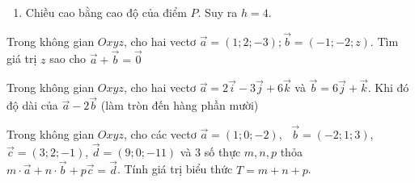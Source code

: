 \begin{ex}
{\begin{enumerate}
			      Suy ra
			      \begin{eqnarray*}
				      \cos \widehat{PFE}&=&\cos \left(\vec{FP},\vec{FE}\right)=\dfrac{\vec{FP}\cdot \vec{FE}}{\left|\vec{FP}\right|\cdot \left|\vec{FE}\right|}\\
				      &=&\dfrac{(-2)\cdot (-4)+0\cdot 0+1\cdot 0}{\sqrt{(-2)^2+0^2+1^2}\cdot \sqrt{(-4)^2+0^2+0^2}}=\dfrac{2\sqrt{5}}{5}.
			      \end{eqnarray*}
			      Do đó, $\widehat{PFE}\approx 26{,}^\circ$. Vậy góc dốc của mái nhà khoảng $26{,}6^\circ$.
			\item Chiều cao bằng cao độ của điểm $P$. Suy ra $h=4$.
		\end{enumerate}
	}
\end{ex} 
\BTTL
\begin{ex}
	Trong không gian $Oxyz$, cho hai vectơ $\vec{a}=(1;2;-3);\vec{b}=(-1;-2;z)$. Tìm giá trị $z$ sao cho	$\vec{a}+\vec{b}=\vec{0}$
\end{ex}
\begin{ex}
	Trong không gian $Oxyz$, cho hai vectơ $\vec{a}=2\vec{i}-3\vec{j}+6\vec{k}$ và $\vec{b}=6\vec{j}+\vec{k}$. Khi đó độ dài của
	$\vec{a}-2\vec{b}$ (làm tròn đến hàng phần mười)
\end{ex}
\begin{ex}
	Trong không gian $Oxyz$, cho các vectơ $\vec{a}=(1;0;-2),\text{ }\vec{b}=(-2;1;3)$,$\vec{c}=(3;2;-1)$, $\vec{d}=(9;0;-11)$ và $3$ số thực $m,n,p$ thỏa $m \cdot \vec{a}+n \cdot \vec{b}+p\vec{c}=\vec{d}$. Tính giá trị biểu thức $T=m+n+p$.
\end{ex}
